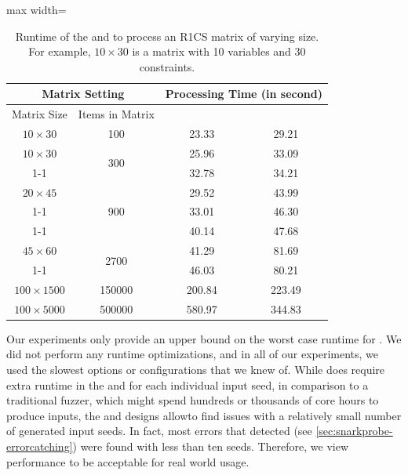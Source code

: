 \begin{table}[t]
\caption{Runtime of the  and  to process an R1CS matrix of varying size.  For example, $10 \times 30$ is a matrix with 10 variables and 30 constraints.}
\vspace*{6pt}
\centering
\begin{adjustbox}{max width=\textwidth}
\begin{tabular}{cc||cc}
\hline
\multicolumn{2}{c||}{Matrix Setting} & \multicolumn{2}{c}{Processing Time (in second)} \\ \hline
\multicolumn{1}{c|}{Matrix Size} & Items in Matrix & \multicolumn{1}{c|}{} &  \\ \hline\hline
\multicolumn{1}{c|}{$10 \times 30$} & 100 & \multicolumn{1}{c|}{23.33} & 29.21 \\ \hline
\multicolumn{1}{c|}{$10 \times 30$} & \multirow{2}{*}{300} & \multicolumn{1}{c|}{25.96} & 33.09 \\ \cline{1-1} \cline{3-4} 
\multicolumn{1}{c|}{$30 \times 10$} &  & \multicolumn{1}{c|}{32.78} & 34.21 \\ \hline
\multicolumn{1}{c|}{$20 \times 45$} & \multirow{3}{*}{900} & \multicolumn{1}{c|}{29.52} & 43.99 \\ \cline{1-1} \cline{3-4} 
\multicolumn{1}{c|}{$30 \times 30$} &  & \multicolumn{1}{c|}{33.01} & 46.30 \\ \cline{1-1} \cline{3-4} 
\multicolumn{1}{c|}{$45 \times 20$} &  & \multicolumn{1}{c|}{40.14} & 47.68 \\ \hline
\multicolumn{1}{c|}{$45 \times 60$} & \multirow{2}{*}{2700} & \multicolumn{1}{c|}{41.29} & 81.69 \\ \cline{1-1} \cline{3-4} 
\multicolumn{1}{c|}{$60 \times 45$} &  & \multicolumn{1}{c|}{46.03} & 80.21 \\ \hline
\multicolumn{1}{c|}{$100 \times 1500$} & 150000 & \multicolumn{1}{c|}{200.84} & 223.49 \\ \hline
\multicolumn{1}{c|}{$100 \times 5000$} & 500000 & \multicolumn{1}{c|}{580.97} & 344.83 \\ \hline
\end{tabular}
\end{adjustbox}
\label{tab:snarkprobe-performance2}
\end{table}

Our experiments only provide an upper bound on the worst case runtime for \SnarkFuzzer.  We did not perform any runtime optimizations, and in all of our experiments, we used the slowest options or configurations that we knew of.
While \SnarkFuzzer does require extra runtime in the  and  for each individual input seed, in comparison to a traditional fuzzer, which might spend hundreds or thousands of core hours to produce inputs, the \framework and \branchmodel designs allow\SnarkFuzzer to find issues with a relatively small number of generated input seeds.
In fact, most errors that \SnarkFuzzer detected (see \autoref{sec:snarkprobe-errorcatching}) were found with less than ten seeds.
Therefore, we view performance to be acceptable for real world usage.

